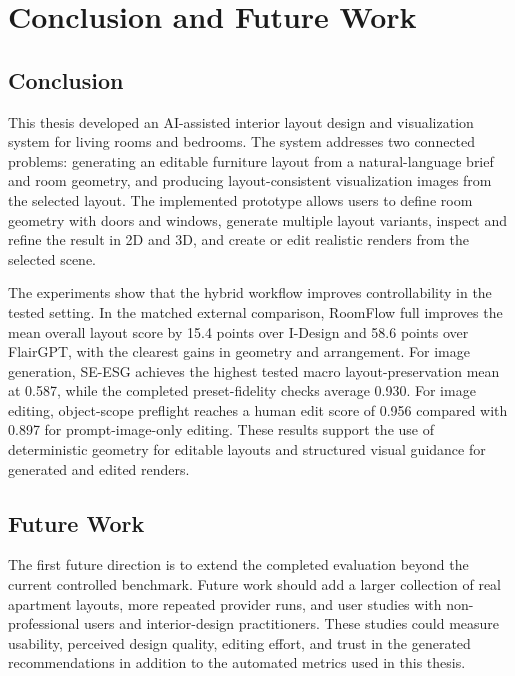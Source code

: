 \chapter{Conclusion and Future Work}

\section{Conclusion}\label{sec:conclusion}

This thesis developed an AI-assisted interior layout design and visualization system for living rooms and bedrooms. The system addresses two connected problems: generating an editable furniture layout from a natural-language brief and room geometry, and producing layout-consistent visualization images from the selected layout. The implemented prototype allows users to define room geometry with doors and windows, generate multiple layout variants, inspect and refine the result in 2D and 3D, and create or edit realistic renders from the selected scene.

The experiments show that the hybrid workflow improves controllability in the tested setting. In the matched external comparison, RoomFlow full improves the mean overall layout score by 15.4 points over I-Design and 58.6 points over FlairGPT, with the clearest gains in geometry and arrangement. For image generation, SE-ESG achieves the highest tested macro layout-preservation mean at 0.587, while the completed preset-fidelity checks average 0.930. For image editing, object-scope preflight reaches a human edit score of 0.956 compared with 0.897 for prompt-image-only editing. These results support the use of deterministic geometry for editable layouts and structured visual guidance for generated and edited renders.

\section{Future Work}\label{sec:future-work}

The first future direction is to extend the completed evaluation beyond the current controlled benchmark. Future work should add a larger collection of real apartment layouts, more repeated provider runs, and user studies with non-professional users and interior-design practitioners. These studies could measure usability, perceived design quality, editing effort, and trust in the generated recommendations in addition to the automated metrics used in this thesis.

